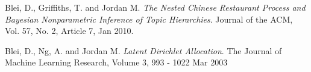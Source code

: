 \documentclass[DIV=calc, paper=a4, fontsize=11pt, twocolumn]{scrartcl}	 %
\begin{document}
\begin{thebibliography}{99}

  Blei, D., Griffiths, T. and Jordan M.
  \emph{The Nested Chinese Restaurant Process and Bayesian Nonparametric Inference of Topic Hierarchies}.
  Journal of the ACM, Vol. 57, No. 2, Article 7,
 Jan 2010.
 
  Blei, D., Ng, A. and Jordan M.
  \emph{Latent Dirichlet Allocation}.
  The Journal of Machine Learning Research,
 Volume 3, 993 - 1022
 Mar 2003
 

\end{thebibliography}
\end{document}

